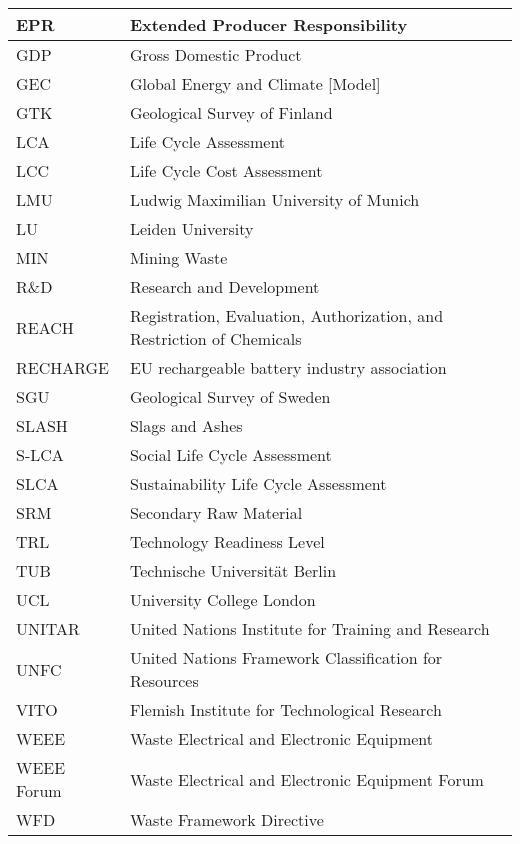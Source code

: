 \begin{longtable}{|L{3cm}|L{12cm}|}
            EPR & Extended Producer Responsibility \\ \hline
            GDP & Gross Domestic Product \\ \hline
            GEC & Global Energy and Climate [Model] \\ \hline
            GTK & Geological Survey of Finland \\ \hline
            LCA & Life Cycle Assessment \\ \hline
            LCC & Life Cycle Cost Assessment \\ \hline
            LMU & Ludwig Maximilian University of Munich \\ \hline
            LU & Leiden University \\ \hline
            MIN & Mining Waste \\ \hline
            R\&D & Research and Development \\ \hline
            REACH & Registration, Evaluation, Authorization, and Restriction of Chemicals \\ \hline
            RECHARGE & EU rechargeable battery industry association \\ \hline
            SGU & Geological Survey of Sweden \\ \hline
            SLASH & Slags and Ashes \\ \hline
            S-LCA & Social Life Cycle Assessment \\ \hline
            SLCA & Sustainability Life Cycle Assessment \\ \hline
            SRM & Secondary Raw Material \\ \hline
            TRL & Technology Readiness Level \\ \hline
            TUB & Technische Universität Berlin \\ \hline
            UCL & University College London \\ \hline
            UNITAR & United Nations Institute for Training and Research \\ \hline
            UNFC & United Nations Framework Classification for Resources \\ \hline
            VITO & Flemish Institute for Technological Research \\ \hline
            WEEE & Waste Electrical and Electronic Equipment \\ \hline
            WEEE Forum & Waste Electrical and Electronic Equipment Forum \\ \hline
            WFD & Waste Framework Directive \\ \hline
            
    \end{longtable}
    
    
\clearpage